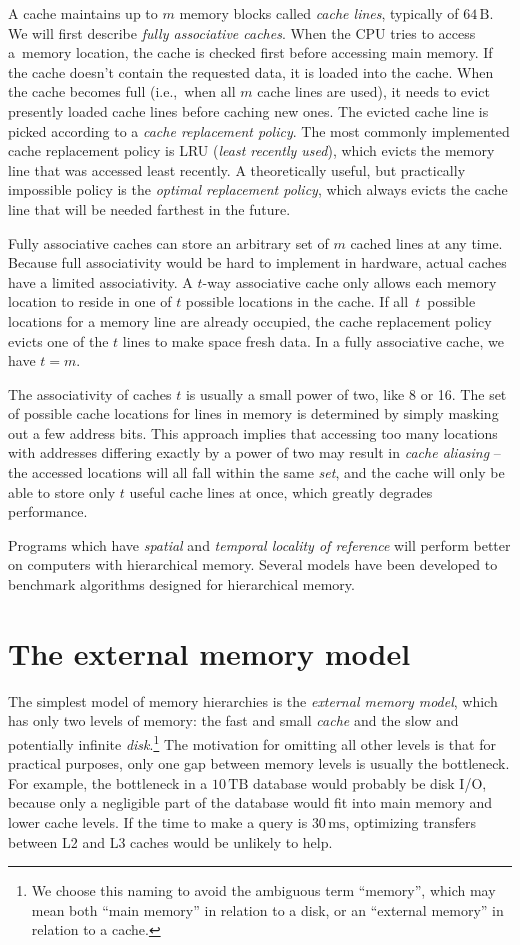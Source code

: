 A cache maintains up to $m$ memory blocks called \textit{cache lines},
typically of $64\,\text{B}$.
We will first describe \emph{fully associative caches}.
When the CPU tries to access a~memory location, the cache is checked first
before accessing main memory. If the cache doesn't contain the requested data,
it is loaded into the cache. When the cache becomes full (i.e.,\ when all $m$
cache lines are used), it needs to evict presently loaded cache lines before
caching new ones. The evicted cache line is picked according to a \emph{cache
replacement policy}. The most commonly implemented cache replacement policy is
LRU (\emph{least recently used}), which evicts the memory line that was
accessed least recently.
A theoretically useful, but practically impossible policy is the \emph{optimal
replacement policy}, which always evicts the cache line that will be needed
farthest in the future.

Fully associative caches can store an arbitrary set of $m$ cached lines
at any time. Because full associativity would be hard to implement in hardware,
actual caches have a limited associativity. A $t$-way associative
cache only allows each memory location to reside in one of $t$ possible
locations in the cache. If all~$t$~possible locations for a memory line
are already occupied, the cache replacement policy evicts one of the $t$
lines to make space fresh data. In a fully associative cache, we have $t=m$.

The associativity of caches $t$ is usually a small power of two, like 8 or 16.
The set of possible cache locations for lines in memory is determined
by simply masking out a few address bits. This approach implies that
accessing too many locations with addresses differing exactly by a power
of two may result in \emph{cache aliasing} -- the accessed locations will
all fall within the same \emph{set}, and the cache will only be able
to store only $t$ useful cache lines at once, which greatly degrades
performance.

Programs which have \emph{spatial} and \emph{temporal locality of reference}
will perform better on computers with hierarchical memory. Several models have
been developed to benchmark algorithms designed for hierarchical memory.

\section{The external memory model}
The simplest model of memory hierarchies is the \emph{external memory model},
which has only two levels of memory: the fast and small \emph{cache} and the
slow and potentially infinite \emph{disk}.\footnote{%
	We choose this naming to avoid the ambiguous term ``memory'',
	which may mean both ``main memory'' in relation to a disk,
	or an ``external memory'' in relation to a cache.
} The motivation for omitting all other levels is that for practical purposes,
only one gap between memory levels is usually the bottleneck. For example,
the bottleneck in a $10\,\text{TB}$ database would probably be disk I/O,
because only a negligible part of the database would fit into main memory and
lower cache levels. If the time to make a query is $30\,\text{ms}$,
optimizing transfers between L2 and L3 caches would be unlikely to help.

